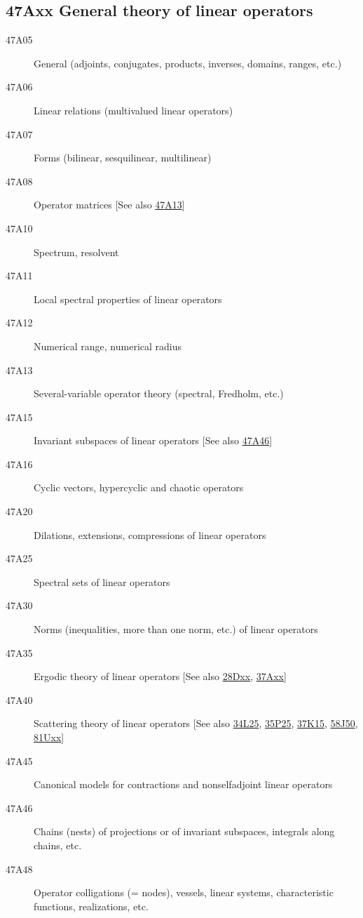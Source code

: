 \subsection*{47Axx  General theory of linear operators }\label{47Axx}
\begin{description}  
\item [47A05]\label{47A05} General (adjoints, conjugates, products, inverses, domains, ranges, etc.)
\item [47A06]\label{47A06} Linear relations (multivalued linear operators)
\item [47A07]\label{47A07} Forms (bilinear, sesquilinear, multilinear)
\item [47A08]\label{47A08} Operator matrices [See also \hyperref[47A13]{47A13}]
\item [47A10]\label{47A10} Spectrum, resolvent
\item [47A11]\label{47A11} Local spectral properties of linear operators
\item [47A12]\label{47A12} Numerical range, numerical radius
\item [47A13]\label{47A13} Several-variable operator theory (spectral, Fredholm, etc.)
\item [47A15]\label{47A15} Invariant subspaces of linear operators [See also \hyperref[47A46]{47A46}]
\item [47A16]\label{47A16} Cyclic vectors, hypercyclic and chaotic operators
\item [47A20]\label{47A20} Dilations, extensions, compressions of linear operators
\item [47A25]\label{47A25} Spectral sets of linear operators
\item [47A30]\label{47A30} Norms (inequalities, more than one norm, etc.) of linear operators
\item [47A35]\label{47A35} Ergodic theory of linear operators [See also \hyperref[28Dxx]{28Dxx}, \hyperref[37Axx]{37Axx}]
\item [47A40]\label{47A40} Scattering theory of linear operators [See also \hyperref[34L25]{34L25}, \hyperref[35P25]{35P25}, \hyperref[37K15]{37K15}, \hyperref[58J50]{58J50}, \hyperref[81Uxx]{81Uxx}]
\item [47A45]\label{47A45} Canonical models for contractions and nonselfadjoint linear operators
\item [47A46]\label{47A46} Chains (nests) of projections or of invariant subspaces, integrals along chains, etc.
\item [47A48]\label{47A48} Operator colligations (= nodes), vessels, linear systems, characteristic functions, realizations, etc.

\end{description}
